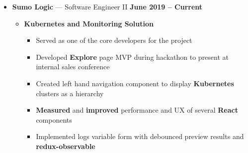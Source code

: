 \documentclass[10pt, oneside]{letter}
\begin{document}
    \begin{adjustwidth}{0.1in}{0pt}

      \begin{itemize}
        \item
          \textbf{Sumo Logic} --- Software Engineer II \hfill \textbf{June 2019 -- Current}
            \begin{itemize}
              \item{\textbf{Kubernetes and Monitoring Solution}}
                \begin{itemize}
                  \item{Served as one of the core developers for the project}
                  \item{Developed \textbf{Explore} page MVP during hackathon to present at internal sales conference}
                  \item{Created left hand navigation component to display \textbf{Kubernetes} clusters as a hierarchy}
                  \item{\textbf{Measured} and \textbf{improved} performance and UX of several \textbf{React} components}
                  \item{Implemented logs variable form with debounced preview results and \textbf{redux-observable}}
                \end{itemize}


\end{itemize}
\end{itemize}
\end{adjustwidth}
\end{document}
